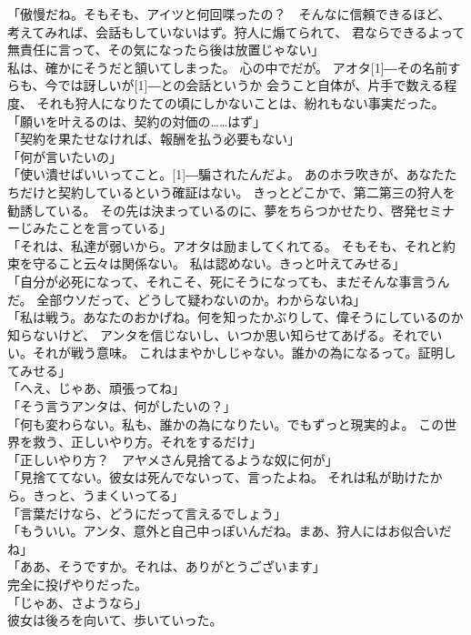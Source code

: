 \documentclass[../IHMain]{subfiles}
\begin{document}
「傲慢だね。そもそも、アイツと何回喋ったの？　そんなに信頼できるほど、
考えてみれば、会話もしていないはず。狩人に煽てられて、
君ならできるよって無責任に言って、その気になったら後は放置じゃない」\\
私は、確かにそうだと頷いてしまった。
心の中でだが。
アオタ\scalebox{3}[1]{―}その名前すらも、今では訝しいが\scalebox{3}[1]{―}との会話というか
会うこと自体が、片手で数える程度、
それも狩人になりたての頃にしかないことは、紛れもない事実だった。\\
「願いを叶えるのは、契約の対価の……はず」\\
「契約を果たせなければ、報酬を払う必要もない」\\
「何が言いたいの」\\
「使い潰せばいいってこと。\scalebox{3}[1]{―}騙されたんだよ。
あのホラ吹きが、あなたたちだけと契約しているという確証はない。
きっとどこかで、第二第三の狩人を勧誘している。
その先は決まっているのに、夢をちらつかせたり、啓発セミナーじみたことを言っている」\\
「それは、私達が弱いから。アオタは励ましてくれてる。
そもそも、それと約束を守ること云々は関係ない。
私は認めない。きっと叶えてみせる」\\
「自分が必死になって、それこそ、死にそうになっても、まだそんな事言うんだ。
全部ウソだって、どうして疑わないのか。わからないね」\\
「私は戦う。あなたのおかげね。何を知ったかぶりして、偉そうにしているのか知らないけど、
アンタを信じないし、いつか思い知らせてあげる。それでいい。それが戦う意味。
これはまやかしじゃない。誰かの為になるって。証明してみせる」\\
「へえ、じゃあ、頑張ってね」\\
「そう言うアンタは、何がしたいの？」\\
「何も変わらない。私も、誰かの為になりたい。でもずっと現実的よ。
この世界を救う、正しいやり方。それをするだけ」\\
「正しいやり方？　アヤメさん見捨てるような奴に何が」\\
「見捨ててない。彼女は死んでないって、言ったよね。
それは私が助けたから。きっと、うまくいってる」\\
「言葉だけなら、どうにだって言えるでしょう」\\
「もういい。アンタ、意外と自己中っぽいんだね。まあ、狩人にはお似合いだね」\\
「ああ、そうですか。それは、ありがとうございます」\\
完全に投げやりだった。\\
「じゃあ、さようなら」\\
彼女は後ろを向いて、歩いていった。
\end{document}
